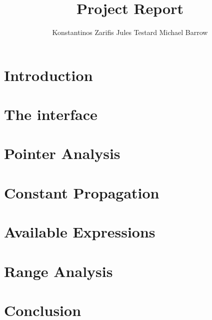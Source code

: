 \documentclass[11pt,twocolumn]{article}
\begin{document}
\title{Project Report}
\author{Konstantinos Zarifis \quad Jules Testard \quad Michael Barrow}
\maketitle

\section{Introduction}



\section{The interface}



\section{Pointer Analysis}



\section{Constant Propagation}



\section{Available Expressions}



\section{Range Analysis}



\section{Conclusion}


\end{document}

